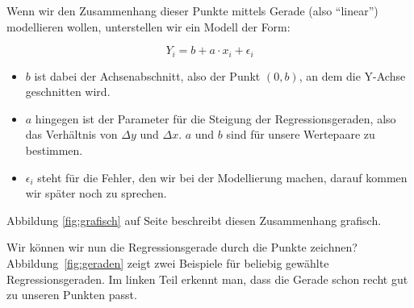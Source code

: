 \documentclass[ngerman, 12pt,parskip=half]{scrartcl}
\begin{document}
Wenn wir den Zusammenhang dieser Punkte mittels Gerade (also \enquote{linear}) modellieren wollen, unterstellen wir ein Modell der Form: 
   
\begin{equation}
	 Y_i = b + a \cdot x_i + \epsilon_i
\end{equation}

\begin{center}
\label{fig:grafisch}
\end{center} 

\begin{itemize}

\item \(b\) ist dabei der Achsenabschnitt, also der Punkt \((0,b)\), an dem die Y-Achse geschnitten wird. 

\item \(a\) hingegen ist der Parameter für die Steigung der Regressionsgeraden, also das Verhältnis von \(\Delta y\) und \(\Delta x\). \(a\) und \(b\) sind für unsere Wertepaare zu bestimmen. 

\item \(\epsilon_i\) steht für die Fehler, den wir bei der Modellierung machen, darauf kommen wir später noch zu sprechen. 

\end{itemize}


Abbildung \ref{fig:grafisch} auf Seite \pageref{fig:grafisch} beschreibt diesen Zusammenhang grafisch.

Wir können wir nun die Regressionsgerade durch die Punkte zeichnen? Abbildung~\ref{fig:geraden} zeigt zwei Beispiele für beliebig gewählte Regressionsgeraden. 
Im linken Teil erkennt man, dass die Gerade schon recht gut zu unseren Punkten passt. 
\end{document}
